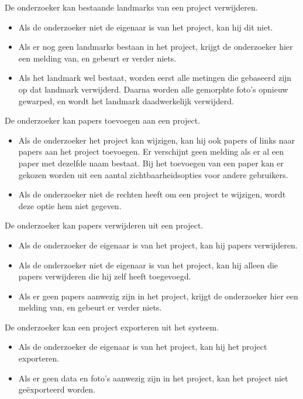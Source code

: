 De onderzoeker kan bestaande landmarks van een project verwijderen.
\begin{itemize}
	\item Als de onderzoeker niet de eigenaar is van het project, kan hij dit niet.
	\item Als er nog geen landmarks bestaan in het project, krijgt de onderzoeker hier een melding van, en gebeurt er verder niets.
	\item Als het landmark wel bestaat, worden eerst alle metingen die gebaseerd zijn op dat landmark verwijderd. Daarna worden alle gemorphte foto's opnieuw gewarped, en wordt het landmark daadwerkelijk verwijderd.
\end{itemize}

De onderzoeker kan papers toevoegen aan een project.
\begin{itemize}
	\item Als de onderzoeker het project kan wijzigen, kan hij ook papers of links naar papers aan het project toevoegen. Er verschijnt geen melding als er al een paper met dezelfde naam bestaat. Bij het toevoegen van een paper kan er gekozen worden uit een aantal zichtbaarheidsopties voor andere gebruikers.
	\item Als de onderzoeker niet de rechten heeft om een project te wijzigen, wordt deze optie hem niet gegeven.
\end{itemize}

De onderzoeker kan papers verwijderen uit een project.
\begin{itemize}
	\item Als de onderzoeker de eigenaar is van het project, kan hij papers verwijderen.
	\item Als de onderzoeker niet de eigenaar is van het project, kan hij alleen die papers verwijderen die hij zelf heeft toegevoegd.
	\item Als er geen papers aanwezig zijn in het project, krijgt de onderzoeker hier een melding van, en gebeurt er verder niets.
\end{itemize}

De onderzoeker kan een project exporteren uit het systeem.
\begin{itemize}
	\item Als de onderzoeker de eigenaar is van het project, kan hij het project exporteren.
	\item Als er geen data en foto's aanwezig zijn in het project, kan het project niet ge\"exporteerd worden.
\end{itemize}


